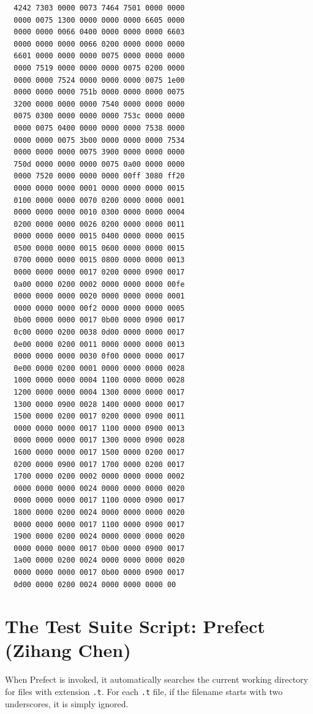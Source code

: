 \documentclass{report}
\begin{document}
\begin{mdframed}[style=cl]
\begin{verbatim}
  4242 7303 0000 0073 7464 7501 0000 0000
  0000 0075 1300 0000 0000 0000 6605 0000
  0000 0000 0066 0400 0000 0000 0000 6603
  0000 0000 0000 0066 0200 0000 0000 0000
  6601 0000 0000 0000 0075 0000 0000 0000
  0000 7519 0000 0000 0000 0075 0200 0000
  0000 0000 7524 0000 0000 0000 0075 1e00
  0000 0000 0000 751b 0000 0000 0000 0075
  3200 0000 0000 0000 7540 0000 0000 0000
  0075 0300 0000 0000 0000 753c 0000 0000
  0000 0075 0400 0000 0000 0000 7538 0000
  0000 0000 0075 3b00 0000 0000 0000 7534
  0000 0000 0000 0075 3900 0000 0000 0000
  750d 0000 0000 0000 0075 0a00 0000 0000
  0000 7520 0000 0000 0000 00ff 3080 ff20
  0000 0000 0000 0001 0000 0000 0000 0015
  0100 0000 0000 0070 0200 0000 0000 0001
  0000 0000 0000 0010 0300 0000 0000 0004
  0200 0000 0000 0026 0200 0000 0000 0011
  0000 0000 0000 0015 0400 0000 0000 0015
  0500 0000 0000 0015 0600 0000 0000 0015
  0700 0000 0000 0015 0800 0000 0000 0013
  0000 0000 0000 0017 0200 0000 0900 0017
  0a00 0000 0200 0002 0000 0000 0000 00fe
  0000 0000 0000 0020 0000 0000 0000 0001
  0000 0000 0000 00f2 0000 0000 0000 0005
  0b00 0000 0000 0017 0b00 0000 0900 0017
  0c00 0000 0200 0038 0d00 0000 0000 0017
  0e00 0000 0200 0011 0000 0000 0000 0013
  0000 0000 0000 0030 0f00 0000 0000 0017
  0e00 0000 0200 0001 0000 0000 0000 0028
  1000 0000 0000 0004 1100 0000 0000 0028
  1200 0000 0000 0004 1300 0000 0000 0017
  1300 0000 0900 0028 1400 0000 0000 0017
  1500 0000 0200 0017 0200 0000 0900 0011
  0000 0000 0000 0017 1100 0000 0900 0013
  0000 0000 0000 0017 1300 0000 0900 0028
  1600 0000 0000 0017 1500 0000 0200 0017
  0200 0000 0900 0017 1700 0000 0200 0017
  1700 0000 0200 0002 0000 0000 0000 0002
  0000 0000 0000 0024 0000 0000 0000 0020
  0000 0000 0000 0017 1100 0000 0900 0017
  1800 0000 0200 0024 0000 0000 0000 0020
  0000 0000 0000 0017 1100 0000 0900 0017
  1900 0000 0200 0024 0000 0000 0000 0020
  0000 0000 0000 0017 0b00 0000 0900 0017
  1a00 0000 0200 0024 0000 0000 0000 0020
  0000 0000 0000 0017 0b00 0000 0900 0017
  0d00 0000 0200 0024 0000 0000 0000 00
\end{verbatim}
\end{mdframed}

\section{The Test Suite Script: Prefect (Zihang Chen)}

When Prefect is invoked, it automatically searches the current working directory for files with extension \texttt{.t}. For each \texttt{.t} file, if the filename starts with two underscores, it is simply ignored.
\end{document}
